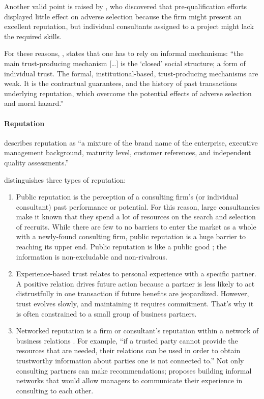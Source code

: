 \documentclass[12pt]{article}
\providecommand{\tightlist}{%
  \setlength{\itemsep}{0pt}\setlength{\parskip}{0pt}}
\begin{document}
Another valid point is raised by \citet[23]{basu2011} , who discovered
that pre-qualification efforts displayed little effect on adverse
selection because the firm might present an excellent reputation, but
individual consultants assigned to a project might lack the required
skills.

For these reasons, \citet[250]{clark1993}, states that one has to rely
on informal mechanisms: ``the main trust-producing mechanism
{[}\ldots{]} is the `closed' social structure; a form of individual
trust. The formal, institutional-based, trust-producing mechanisms are
weak. It is the contractual guarantees, and the history of past
transactions underlying reputation, which overcome the potential effects
of adverse selection and moral hazard.''

\paragraph{Reputation}\label{reputation}

\citet[193]{kirilov2012} describes reputation as ``a mixture of the
brand name of the enterprise, executive management background, maturity
level, customer references, and independent quality assessments.''

\citet[75-76]{armbruster2006} distinguishes three types of reputation:

\begin{enumerate}
\def\labelenumi{\arabic{enumi}.}
\tightlist
\item
  Public reputation is the perception of a consulting firm's (or
  individual consultant) past performance or potential. For this reason,
  large consultancies make it known that they spend a lot of resources
  on the search and selection of recruits. \citep[ 91]{kieser2006} While
  there are few to no barriers to enter the market as a whole with a
  newly-found consulting firm, public reputation is a huge barrier to
  reaching its upper end. Public reputation is like a public good ; the
  information is non-excludable and non-rivalrous.
\item
  Experience-based trust relates to personal experience with a specific
  partner. A positive relation drives future action because a partner is
  less likely to act distrustfully in one transaction if future benefits
  are jeopardized. \citep[ 367]{shapiro1992} However, trust evolves
  slowly, and maintaining it requires commitment. That's why it is often
  constrained to a small group of business partners.
\item
  Networked reputation is a firm or consultant's reputation within a
  network of business relations \citep[ 271]{gluckler2003}. For example,
  ``if a trusted party cannot provide the resources that are needed,
  their relations can be used in order to obtain trustworthy information
  about parties one is not connected to.'' \citep[ 280]{gluckler2003}
  Not only consulting partners can make recommendations;
  \citet[308]{honer2006} proposes building informal networks that would
  allow managers to communicate their experience in consulting to each
  other.
\end{enumerate}
\end{document}
